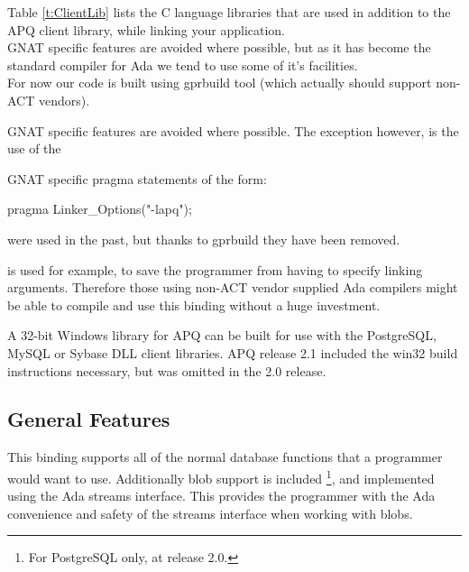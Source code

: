 \documentclass[english,letterpaper]{book}
\begin{document}
Table \ref{t:ClientLib} 
lists the C language libraries that are
used in addition to the APQ client library, while linking your
application.\\


GNAT specific features are avoided where possible, but as it has become the 
standard compiler for Ada we tend to use some of it's facilities.\\


For now our code is built using gprbuild tool (which actually should support 
non-ACT vendors).

GNAT specific features are avoided where possible. The exception
however, is the use of the

GNAT specific pragma statements of the form:\\

\begin{Code}

   pragma Linker_Options("-lapq");

\end{Code}


were used in the past, but thanks to gprbuild they have been removed.

is used for example, to save the programmer from having to specify
linking arguments. Therefore those using non-ACT vendor
supplied Ada compilers might be able to compile and use this binding
without a huge investment.

A 32-bit Windows library for APQ can be built for use with the PostgreSQL,
MySQL or Sybase DLL client libraries. APQ release 2.1 included the
win32 build instructions necessary, but was omitted in the 2.0 release.


\subsection{General Features}

This binding supports all of the normal database functions that a
programmer would want to use. Additionally blob support
is included%
\footnote{For PostgreSQL only, at release 2.0.%
}, and implemented using the Ada streams interface.
This provides the programmer with the Ada convenience and safety of
the streams interface when working with blobs.
\end{document}

